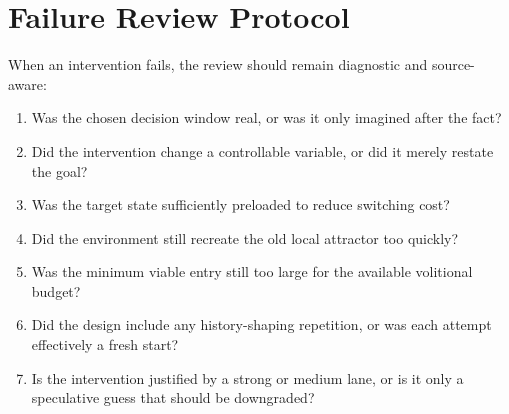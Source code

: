 \section{Failure Review Protocol}

When an intervention fails, the review should remain diagnostic and source-aware:
\begin{enumerate}[nosep]
  \item Was the chosen decision window real, or was it only imagined after the
        fact?
  \item Did the intervention change a controllable variable, or did it merely
        restate the goal?
  \item Was the target state sufficiently preloaded to reduce switching cost?
  \item Did the environment still recreate the old local attractor too quickly?
  \item Was the minimum viable entry still too large for the available
        volitional budget?
  \item Did the design include any history-shaping repetition, or was each
        attempt effectively a fresh start?
  \item Is the intervention justified by a strong or medium lane, or is it only
        a speculative guess that should be downgraded?
\end{enumerate}
